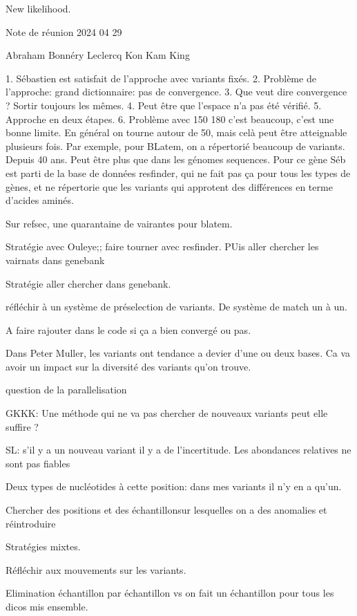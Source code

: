 \documentclass{article}
\begin{document}
New likelihood.


Note de réunion 2024 04 29

Abraham Bonnéry Leclercq Kon Kam King

1. Sébastien est satisfait de l'approche avec variants fixés.
2. Problème de l'approche: grand dictionnaire: pas de convergence.
3. Que veut dire convergence ? 
Sortir toujours les mêmes.
4. Peut être que l'espace n'a pas été vérifié.
5. Approche en deux étapes.
6. Problème avec 150 180 c'est beaucoup, c'est une bonne limite. En général on tourne autour de 50, mais celà peut être atteignable plusieurs fois.
Par exemple, pour  BLatem, on a répertorié beaucoup de variants. Depuis 40 ans. Peut être plus que dans les génomes sequences.
Pour ce gène Séb est parti de la base de données resfinder, qui ne fait pas ça pour tous les types de gènes, et ne répertorie que les variants qui approtent des différences en terme d'acides aminés.

Sur refsec, une quarantaine de vairantes pour blatem.

Stratégie avec Ouleye;; faire tourner avec resfinder. PUis aller chercher les vairnats dans genebank

Stratégie aller chercher dans genebank. 


réfléchir à un système de préselection de variants. 
De système de match un à un.





A faire rajouter dans le code si ça a bien convergé ou pas.

Dans Peter Muller, les variants ont tendance a devier d'une ou deux bases.
Ca va avoir un impact sur la diversité des variants qu'on trouve.

question de la parallelisation

GKKK: Une méthode qui ne va pas chercher de nouveaux variants peut elle suffire ?

SL: s'il y a un nouveau variant il y a de l'incertitude. Les abondances relatives ne sont pas fiables

Deux types de nucléotides à cette position: dans mes variants il n'y en a qu'un.

Chercher des positions et des échantillonsur lesquelles on a des anomalies et réintroduire 

Stratégies mixtes.

Réfléchir aux mouvements sur les variants.

Elimination échantillon par échantillon
vs on fait un échantillon pour tous les dicos mis ensemble. 
\end{document}
